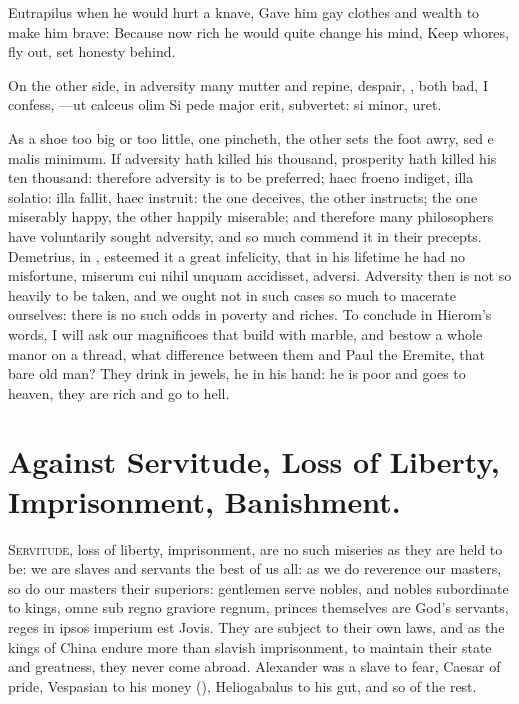 {Eutrapilus when he would hurt a knave,
Gave him gay clothes and wealth to make him brave:
Because now rich he would quite change his mind,
Keep whores, fly out, set honesty behind.

On the other side, in adversity many mutter and repine, despair, \etc{},
both bad, I confess,
---ut calceus olim
Si pede major erit, subvertet: si minor, uret.

As a shoe too big or too little, one pincheth, the other sets the foot
awry, sed e malis minimum. If adversity hath killed his thousand,
prosperity hath killed his ten thousand: therefore adversity is to be
preferred; haec froeno indiget, illa solatio: illa fallit, haec
instruit: the one deceives, the other instructs; the one miserably
happy, the other happily miserable; and therefore many philosophers
have voluntarily sought adversity, and so much commend it in their
precepts. Demetrius, in \Seneca, esteemed it a great infelicity, that in
his lifetime he had no misfortune, miserum cui nihil unquam accidisset,
adversi. Adversity then is not so heavily to be taken, and we ought not
in such cases so much to macerate ourselves: there is no such odds in
poverty and riches. To conclude in Hierom's words, I will ask our
magnificoes that build with marble, and bestow a whole manor on a
thread, what difference between them and Paul the Eremite, that bare
old man? They drink in jewels, he in his hand: he is poor and goes to
heaven, they are rich and go to hell.


\section{Against Servitude, Loss of Liberty, Imprisonment, Banishment.}

\lettrine{S}{ervitude}, loss of liberty, imprisonment, are no such miseries as they
are held to be: we are slaves and servants the best of us all: as we do
reverence our masters, so do our masters their superiors: gentlemen
serve nobles, and nobles subordinate to kings, omne sub regno graviore
regnum, princes themselves are God's servants, reges in ipsos imperium
est Jovis. They are subject to their own laws, and as the kings of
China endure more than slavish imprisonment, to maintain their state
and greatness, they never come abroad. Alexander was a slave to fear,
Caesar of pride, Vespasian to his money (), Heliogabalus to his gut, and so of the rest.

}
